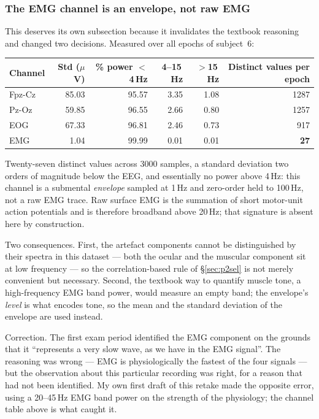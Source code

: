 \documentclass[11pt,a4paper]{article}
\newcommand{\hertz}{Hz}
\newcommand{\volt}{V}
\newcommand{\micro}{\ensuremath{\mu}}
\newcommand{\num}[1]{#1}
\newcommand{\si}[1]{#1}
\newcommand{\SI}[2]{#1\,#2}
\newcommand{\SIrange}[3]{#1--#2\,#3}
\newcommand{\change}[1]{\textcolor{black!70}{\textsf{\footnotesize #1}}}
\begin{document}
\subsubsection{The EMG channel is an envelope, not raw EMG}
\label{sec:p2emg}

This deserves its own subsection because it invalidates the textbook reasoning and changed two
decisions. Measured over all epochs of subject~6:

\begin{center}\small
\begin{tabular}{lrrrrr}
\toprule
Channel & Std (\si{\micro\volt}) & \% power $<$\SI{4}{\hertz} & \SIrange{4}{15}{\hertz} & $>$\SI{15}{\hertz} & Distinct values per epoch \\
\midrule
Fpz-Cz & 85.03 & 95.57 & 3.35 & 1.08 & 1287 \\
Pz-Oz  & 59.85 & 96.55 & 2.66 & 0.80 & 1257 \\
EOG    & 67.33 & 96.81 & 2.46 & 0.73 &  917 \\
EMG    &  1.04 & 99.99 & 0.01 & 0.01 &   \textbf{27} \\
\bottomrule
\end{tabular}
\end{center}

Twenty-seven distinct values across \num{3000} samples, a standard deviation two orders of
magnitude below the EEG, and essentially no power above \SI{4}{\hertz}: this channel is a
submental \emph{envelope} sampled at \SI{1}{\hertz} and zero-order held to \SI{100}{\hertz}, not
a raw EMG trace. Raw surface EMG is the summation of short motor-unit action potentials and is
therefore broadband above \SI{20}{\hertz}; that signature is absent here by construction.

Two consequences. First, the artefact components cannot be distinguished by their spectra in
this dataset --- both the ocular and the muscular component sit at low frequency --- so the
correlation-based rule of \S\ref{sec:p2sel} is not merely convenient but necessary. Second, the
textbook way to quantify muscle tone, a high-frequency EMG band power, would measure an empty
band; the envelope's \emph{level} is what encodes tone, so the mean and the standard deviation
of the envelope are used instead.

\change{Correction. The first exam period identified the EMG component on the grounds that it
``represents a very slow wave, as we have in the EMG signal''. The reasoning was wrong ---
EMG is physiologically the fastest of the four signals --- but the observation about this
particular recording was right, for a reason that had not been identified. My own first draft
of this retake made the opposite error, using a \SIrange{20}{45}{\hertz} EMG band power on the
strength of the physiology; the channel table above is what caught it.}
\end{document}
